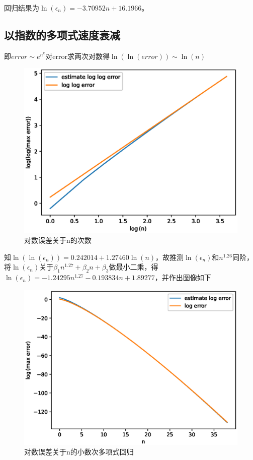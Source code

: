 \documentclass{article}
\begin{document}
	回归结果为$\ln(\epsilon_n) = -3.70952 n + 16.1966$。
	
    \subsection{以指数的多项式速度衰减}
    即$error\sim e^{n^{k}}$对error求两次对数得$\ln(\ln(error))\sim  \ln(n)$
    
    \begin{figure}[H]
    	\centering
    	\includegraphics[width = 16cm]{linear regression of loglogerror to logn.eps}
    	\caption{对数误差关于n的次数}
    \end{figure}
    
    知$\ln(\ln(\epsilon_n))=0.242014 + 1.27460\ln(n)$，故推测$\ln(\epsilon_n)$和$n^1.26$同阶，将$\ln(\epsilon_n)$关于$\beta_1 n^{1.27} + \beta_2 n + \beta_3$做最小二乘，得$\ln(\epsilon_n) = -1.24295 n^{1.27} -0.193834 n +  1.89277$，并作出图像如下
    
    \begin{figure}[H]
    	\centering
    	\includegraphics[width = 16cm]{1.27 deg regression of log error to n.eps}
    	\caption{对数误差关于n的小数次多项式回归}
    \end{figure}
\end{document}

